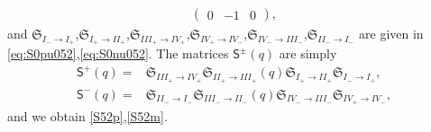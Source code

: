 \documentclass[12pt,reqno]{amsart}
\theoremstyle{definition}
\def\md{\mathbf}
\def\mf{\mathfrak}
\def\ms{\mathsf}
\begin{document}
\begin{align}
\begin{pmatrix}
                0&-1&0
              \end{pmatrix},%
\end{align}
and $\mf{S}_{I_-\to I_+}$,$\mf{S}_{I_+\to
  II_+}$,$\mf{S}_{III_+\to
  IV_+}$,$\mf{S}_{IV_+\to
  IV_-}$,$\mf{S}_{IV_-\to III_-}$,$\mf{S}_{II_-\to I_-}$ are given in
\eqref{eq:S0pu052},\eqref{eq:S0nu052}. The matrices
$\ms{S}^{\pm}(q)$ are simply
\begin{align}
  \ms{S}^+(q) = &\mf{S}_{III_+\to IV_+}
                  \mf{S}_{II_+\to III_+}(q)\mf{S}_{I_+\to II_+}\mf{S}_{I_-\to I_+},\\
  \ms{S}^-(q) = &\mf{S}_{II_-\to I_-}\mf{S}_{III_-\to
                  II_-}(q)\mf{S}_{IV_-\to III_-} \mf{S}_{IV_+\to IV_-},
\end{align}
and we obtain \eqref{S52p},\eqref{S52m}.
\end{document}
